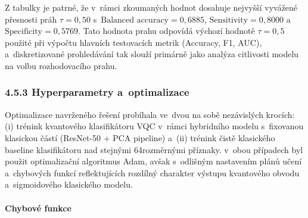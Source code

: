\documentclass[12pt, a4paper]{report}
\begin{document}
Z tabulky je patrné, že v~rámci zkoumaných hodnot dosahuje nejvyšší
vyvážené přesnosti práh \(\tau = 0{,}50\) s~\(\text{Balanced accuracy} = 0{,}6885\),
\(\text{Sensitivity} = 0{,}8000\) a~\(\text{Specificity} = 0{,}5769\). 
Tato hodnota prahu odpovídá výchozí hodnotě \(\tau = 0{,}5\) použité při výpočtu
hlavních testovacích metrik (Accuracy, F1, AUC), a~diskretizované prohledávání
tak slouží primárně jako analýza citlivosti modelu na volbu rozhodovacího prahu. 

\subsubsection*{4.5.3 Hyperparametry a~optimalizace}

Optimalizace navrženého řešení probíhala ve~dvou na sobě nezávislých krocích:
(i) trénink kvantového klasifikátoru VQC v~rámci hybridního modelu s~fixovanou
klasickou částí (ResNet-50 + PCA pipeline) a~(ii) trénink čistě klasického baseline
klasifikátoru nad stejnými 64rozměrnými příznaky. v~obou případech byl použit
optimalizační algoritmus Adam, avšak s~odlišným nastavením plánů učení a~chybových
funkcí reflektujících rozdílný charakter výstupu kvantového obvodu a~sigmoidového
klasického modelu.

\paragraph{Chybové funkce}
\end{document}
